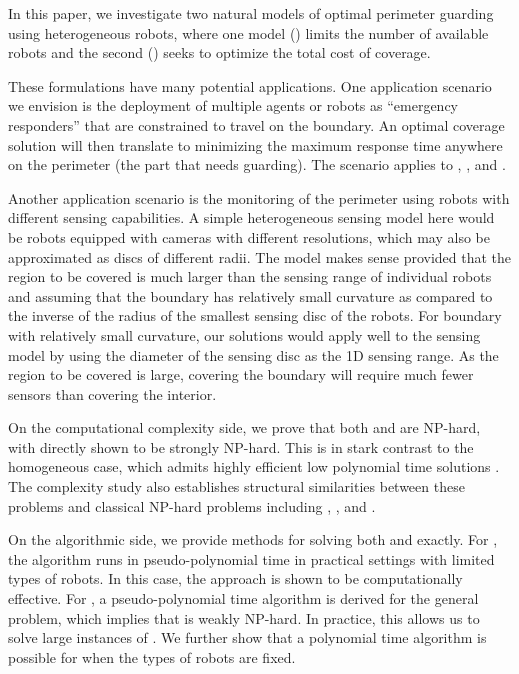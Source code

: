 In this paper, we investigate two natural models of optimal perimeter 
guarding using heterogeneous robots, where one model (\opglr) limits 
the number of available robots and the second (\opgmc) seeks to 
optimize the total cost of coverage. 

These formulations have many potential applications. One application 
scenario we envision is the deployment of multiple agents or robots 
as ``emergency responders'' that are constrained to travel on the 
boundary. An optimal coverage solution will then translate to minimizing 
the maximum response time anywhere on the perimeter (the part that 
needs guarding). The scenario applies to \opg, \opglr, and \opgmc. 

Another application scenario is the monitoring of the perimeter 
using robots with different sensing capabilities. A simple heterogeneous 
sensing model here would be robots equipped with cameras with different 
resolutions, which may also be approximated as discs of different radii. 
The model makes sense provided that the region to be covered is much 
larger than the sensing range of individual robots and assuming that the 
boundary has relatively small curvature as compared to the inverse of the 
radius of the smallest sensing disc of the robots. For boundary with 
relatively small curvature, our solutions would apply well to the sensing 
model by using the diameter of the sensing disc as the 1D sensing range. 
As the region to be covered is large, covering the boundary will require
much fewer sensors than covering the interior. 


On the computational complexity 
side, we prove that both \opglr and \opgmc are NP-hard, with \opglr 
directly shown to be strongly NP-hard. This is in stark contrast to 
the homogeneous case, which admits highly efficient low polynomial 
time solutions \cite{FenHanGaoYu19RSS}. The complexity study also 
establishes structural similarities between these problems and 
classical NP-hard problems including \tpart, \ttkp, and \subsetsum.

On the algorithmic side, we provide methods for solving both \opglr 
and \opgmc exactly. For \opglr, the algorithm runs in pseudo-polynomial 
time in practical settings with limited types of robots. In 
this case, the approach is shown to be computationally effective. 
For \opgmc, a pseudo-polynomial time algorithm is derived for the 
general problem, which implies that \opgmc is weakly NP-hard. In 
practice, this allows us to solve large instances of \opgmc. We 
further show that a polynomial time algorithm is possible for 
\opgmc when the types of robots are fixed. 

